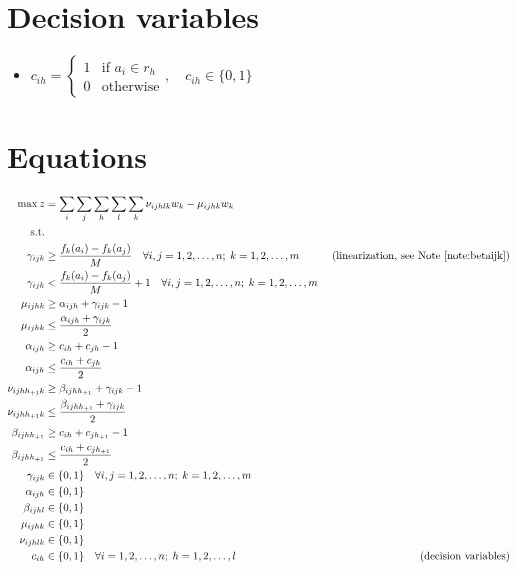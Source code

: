 \documentclass[a4paper]{article}
\begin{document}
    \section{Decision variables}
    \begin{itemize}
        \item $c_{ih} = \begin{cases}
            1 & \text{if } a_i \in r_h \\
            0 & \text{otherwise}
        \end{cases}, \quad c_{ih} \in \{0, 1\}$
    \end{itemize}
    \section{Equations}
    \begin{align}
    	\max z &= \sum_i \sum_j \sum_h \sum_l \sum_k \nu_{ijhlk} w_k - \mu_{ijhk} w_k \\
        \text{s.t.} & \\
        \gamma_{ijk} &\geq \frac{f_k(a_i)-f_k(a_j)}{M} \quad \forall i,j = 1, 2, \dots, n;\; k = 1, 2, \dots, m & \text{ (linearization, see Note \ref{note:betaijk})} \\
        \gamma_{ijk} &< \frac{f_k(a_i)-f_k(a_j)}{M} + 1 \quad \forall i,j = 1, 2, \dots, n;\; k = 1, 2, \dots, m \\
        \mu_{ijhk}  &\geq \alpha_{ijh} + \gamma_{ijk} - 1 \\
        \mu_{ijhk} &\leq \frac{\alpha_{ijh} + \gamma_{ijk}}{2} \\
        \alpha_{ijh} &\geq c_{ih} + c_{jh} - 1\\
        \alpha_{ijh} &\leq \frac{c_{ih} + c_{jh}}{2} \\
        \nu_{ijhh_{+1}k}  &\geq \beta_{ijhh_{+1}} + \gamma_{ijk} - 1 \\
        \nu_{ijhh_{+1}k} &\leq \frac{\beta_{ijhh_{+1}} + \gamma_{ijk}}{2} \\
        \beta_{ijhh_{+1}} &\geq c_{ih} + c_{jh_{+1}} - 1\\
        \beta_{ijhh_{+1}} &\leq \frac{c_{ih} + c_{jh_{+1}}}{2} \\
        \gamma_{ijk} &\in \{0,1\} \quad \forall i,j = 1, 2, \dots, n;\; k = 1, 2, \dots, m \\
        \alpha_{ijh} &\in \{0,1\} \\
        \beta_{ijhl} &\in \{0,1\} \\
        \mu_{ijhk} &\in \{0,1\} \\
        \nu_{ijhlk} &\in \{0,1\} \\
        c_{ih} &\in \{0, 1\} \quad \forall i = 1, 2, \dots, n;\; h = 1, 2, \dots, l & \text{ (decision variables)}
    \end{align}
\end{document}
